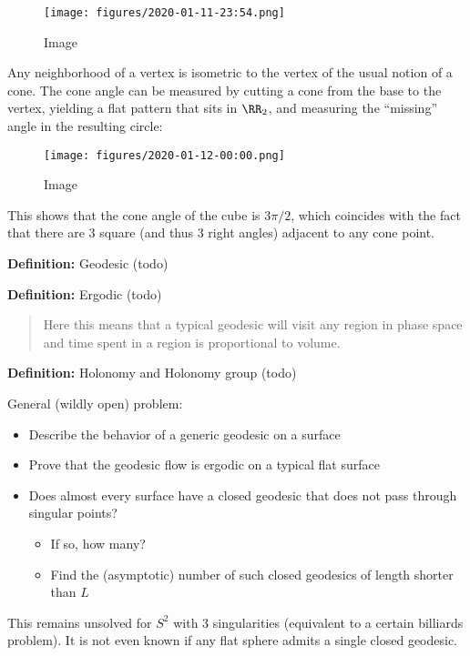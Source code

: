 \begin{figure}
\centering
\texttt{[image: figures/2020-01-11-23:54.png]}
\caption{Image}
\end{figure}

Any neighborhood of a vertex is isometric to the vertex of the usual
notion of a cone. The cone angle can be measured by cutting a cone from
the base to the vertex, yielding a flat pattern that sits in \(\RR_2\),
and measuring the ``missing'' angle in the resulting circle:

\begin{figure}
\centering
\texttt{[image: figures/2020-01-12-00:00.png]}
\caption{Image}
\end{figure}

This shows that the cone angle of the cube is \(3\pi/2\), which
coincides with the fact that there are 3 square (and thus 3 right
angles) adjacent to any cone point.

\textbf{Definition:} Geodesic (todo)

\textbf{Definition:} Ergodic (todo)

\begin{quote}
Here this means that a typical geodesic will visit any region in phase
space and time spent in a region is proportional to volume.
\end{quote}

\textbf{Definition:} Holonomy and Holonomy group (todo)

General (wildly open) problem:

\begin{itemize}
\tightlist
\item
  Describe the behavior of a generic geodesic on a surface
\item
  Prove that the geodesic flow is ergodic on a typical flat surface
\item
  Does almost every surface have a closed geodesic that does not pass
  through singular points?

  \begin{itemize}
  \tightlist
  \item
    If so, how many?
  \item
    Find the (asymptotic) number of such closed geodesics of length
    shorter than \(L\)
  \end{itemize}
\end{itemize}

This remains unsolved for \(S^2\) with 3 singularities (equivalent to a
certain billiards problem). It is not even known if any flat sphere
admits a single closed geodesic.

